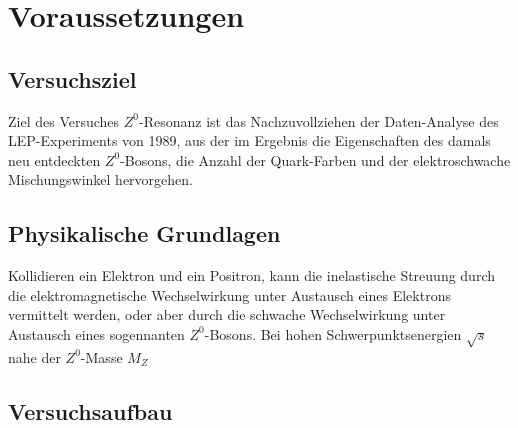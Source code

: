 \section{Voraussetzungen}

\subsection{Versuchsziel}

Ziel des Versuches $Z^0$-Resonanz ist das Nachzuvollziehen der Daten-Analyse des
LEP-Experiments von 1989, aus der im Ergebnis die Eigenschaften des damals neu
entdeckten $Z^0$-Bosons, die Anzahl der Quark-Farben und der elektroschwache
Mischungswinkel hervorgehen.

\subsection{Physikalische Grundlagen}

Kollidieren ein Elektron und ein Positron, kann die inelastische Streuung durch
die elektromagnetische Wechselwirkung unter Austausch eines Elektrons vermittelt
werden, oder aber durch die schwache Wechselwirkung unter Austausch eines
sogennanten $Z^0$-Bosons. Bei hohen Schwerpunktsenergien $\sqrt{s}$ nahe der
$Z^0$-Masse $M_Z$



\subsection{Versuchsaufbau}